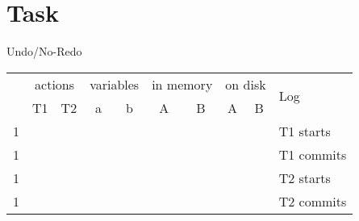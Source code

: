 \documentclass{article}
\begin{document}
\section{Task}
Undo/No-Redo

\begin{center}
    
    \begin{tabular}{| c | c c c c c c c c l |}
        \hline
        \multirow{2}{*}{} &
        \multicolumn{2}{c}{actions} & 
        \multicolumn{2}{c}{variables} & 
        \multicolumn{2}{c}{in memory} & 
        \multicolumn{2}{c}{on disk} & 
        \multirow{2}{*}{Log}\\
        & T1 & T2 & a & b & A & B & A & B & \\
        \hline
        1 & & & & & & & & & T1 starts\\
        1 & & & & & & & & & T1 commits\\
        1 & & & & & & & & & T2 starts\\
        1 & & & & & & & & & T2 commits\\
        \hline
    \end{tabular}
\end{center}
    
\end{document}
